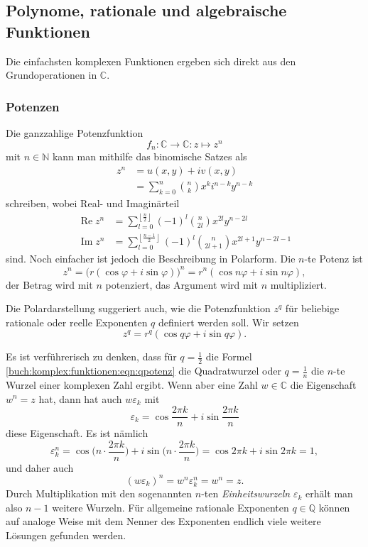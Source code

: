 %
%
%
\subsection{Polynome, rationale und algebraische Funktionen}
Die einfachsten komplexen Funktionen ergeben sich direkt aus den
Grundoperationen in $\mathbb{C}$.

%
%
\subsubsection{Potenzen}
%
Die ganzzahlige Potenzfunktion
\[
f_n
\colon
\mathbb{C}\to\mathbb{C}
:
z\mapsto z^n
\]
mit $n\in\mathbb{N}$ kann man mithilfe das binomische Satzes
%
als
\begin{align*}
z^n &= u(x,y) + iv(x,y)
\\
&=
\sum_{k=0}^n \binom{n}{k} x^k i^{n-k} y^{n-k}
\end{align*}
schreiben, wobei Real- und Imaginärteil
\begin{align*}
\operatorname{Re}z^n
&=
\sum_{l=0}^{\left\lfloor\frac{n}2\right\rfloor}
(-1)^l
\binom{n}{2l}
x^{2l} y^{n-2l}
\\
\operatorname{Im}z^n
&=
\sum_{l=0}^{\left\lfloor\frac{n-1}2\right\rfloor}
(-1)^l
\binom{n}{2l+1}
x^{2l+1} y^{n-2l-1}
\end{align*}
sind.
Noch einfacher ist jedoch die Beschreibung in Polarform.
%
Die $n$-te Potenz ist
\[
z^n
=
\bigl(r(\cos\varphi+i\sin\varphi)\bigr)^n
=
r^n(\cos n\varphi+ i\sin n\varphi),
\]
der Betrag wird mit $n$ potenziert, das Argument wird mit $n$
multipliziert.

Die Polardarstellung suggeriert auch, wie die Potenzfunktion $z^q$ 
%
für beliebige rationale oder reelle Exponenten $q$ definiert werden
soll.
Wir setzen
\begin{equation}
z^q
=
r^q (\cos q\varphi + i \sin q\varphi).
\label{buch:komplex:funktionen:eqn:qpotenz}
\end{equation}

Es ist verführerisch zu denken, dass für $q=\frac12$
die Formel \eqref{buch:komplex:funktionen:eqn:qpotenz}
die Quadratwurzel
oder $q=\frac1n$ die $n$-te Wurzel einer komplexen Zahl ergibt.
Wenn aber eine Zahl $w\in\mathbb{C}$ die Eigenschaft $w^n=z$ hat,
dann hat auch $w\varepsilon_k$ mit
\[
\varepsilon_k
=
\cos\frac{2\pi k}{n}
+
i
\sin\frac{2\pi k}{n}
\]
diese Eigenschaft.
Es ist nämlich
\[
\varepsilon_k^n
=
\cos \biggl(n\cdot \frac{2\pi k}{n}\biggr)
+
i
\sin \biggl(n\cdot \frac{2\pi k}{n}\biggr)
=
\cos 2\pi k
+
i
\sin 2\pi k
=
1,
\]
und daher auch
\[
(w\varepsilon_k)^n
=
w^n\varepsilon_k^n
=
w^n
=
z.
\]
Durch Multiplikation mit den sogenannten $n$-ten \emph{Einheitswurzeln}
%
$\varepsilon_k$ erhält man also $n-1$ weitere Wurzeln.
Für allgemeine rationale Exponenten $q\in\mathbb{Q}$ können auf
analoge Weise mit dem Nenner des Exponenten endlich viele weitere
Lösungen gefunden werden.

